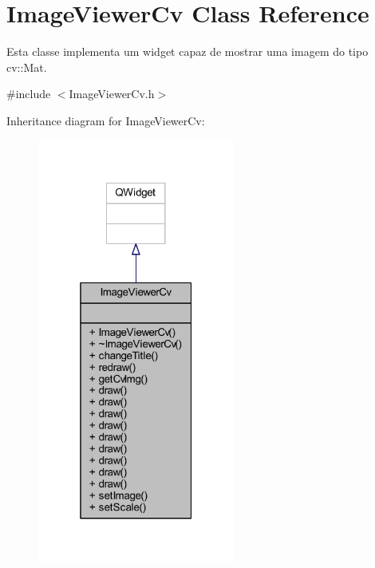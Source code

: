 \hypertarget{class_image_viewer_cv}{}\section{Image\+Viewer\+Cv Class Reference}
\label{class_image_viewer_cv}


Esta classe implementa um widget capaz de mostrar uma imagem do tipo cv\+::\+Mat.  




{\ttfamily \#include $<$Image\+Viewer\+Cv.\+h$>$}



Inheritance diagram for Image\+Viewer\+Cv\+:
\nopagebreak
\begin{figure}[H]
\begin{center}
\leavevmode
\includegraphics[width=184pt]{class_image_viewer_cv__inherit__graph}
\end{center}
\end{figure}


